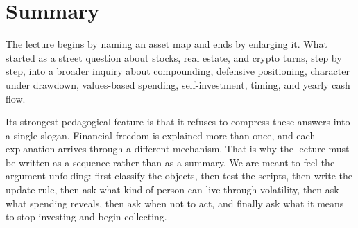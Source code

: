 \section{Summary}

The lecture begins by naming an asset map and ends by enlarging it. What started as a street question about stocks, real estate, and crypto turns, step by step, into a broader inquiry about compounding, defensive positioning, character under drawdown, values-based spending, self-investment, timing, and yearly cash flow.

Its strongest pedagogical feature is that it refuses to compress these answers into a single slogan. Financial freedom is explained more than once, and each explanation arrives through a different mechanism. That is why the lecture must be written as a sequence rather than as a summary. We are meant to feel the argument unfolding: first classify the objects, then test the scripts, then write the update rule, then ask what kind of person can live through volatility, then ask what spending reveals, then ask when not to act, and finally ask what it means to stop investing and begin collecting.